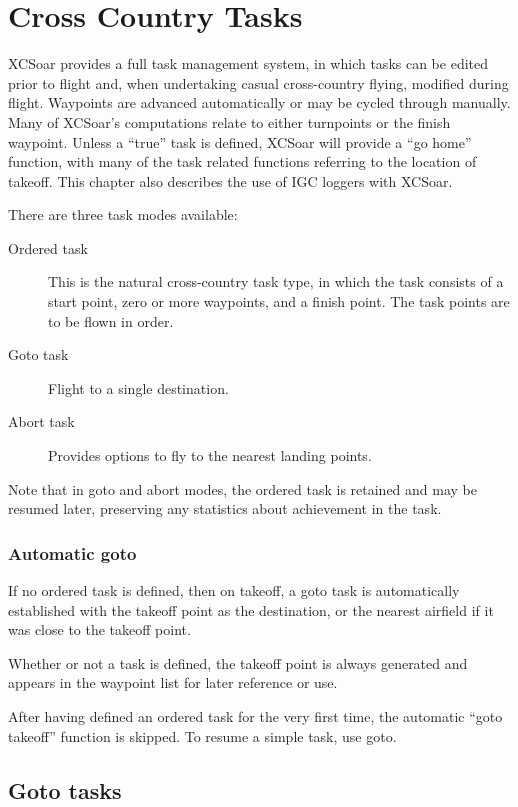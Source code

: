 \chapter{Cross Country Tasks}\label{cha:tasks}

XCSoar provides a full task management system, in which tasks can be
edited prior to flight and, when undertaking casual cross-country
flying, modified during flight.  Waypoints are advanced automatically
or may be cycled through manually. Many of XCSoar's computations relate to
either turnpoints or the finish waypoint.
Unless a ``true'' task is defined, XCSoar will provide a ``go home'' function, with
many of the task related functions referring to the location of takeoff.
This chapter also describes the use of IGC loggers with XCSoar.

There are three task modes available:
\begin{description}
\item[Ordered task] This is the natural cross-country task type,
in which the task consists of a start point, zero or more waypoints,
and a finish point.  The task points are to be flown in order.
\item[Goto task] Flight to a single destination.
\item[Abort task] Provides options to fly to the nearest landing points.
\end{description}

Note that in goto and abort modes, the ordered task is retained and may be resumed
later, preserving any statistics about achievement in the task.

\subsection*{Automatic goto}

If no ordered task is defined, then on takeoff, a goto task is automatically
established with the takeoff point as the destination, or the nearest airfield
if it was close to the takeoff point.

Whether or not a task is defined, the takeoff point is always
generated and appears in the waypoint list for later reference or use.

After having defined an ordered task for the very first time, the automatic ``goto takeoff'' function is skipped. To resume a simple task, use goto.

\section{Goto tasks}

